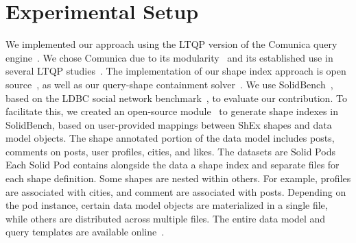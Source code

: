 \section{Experimental Setup}






We implemented our approach using the LTQP version of the Comunica query engine~\cite{taelman_iswc_resources_comunica_2018}.
We chose Comunica due to its modularity~\cite{taelman_swj_componentsjs_2022} and its established use in several LTQP studies~\cite{Bogaerts2021LinkTW, Taelman2023, eschauzier_quweda_linkqueue_2023, Hanski2024, eschauzier_amw_rcubemetric_2024, tam2024opportunitiesshapebasedoptimizationlink}.
The implementation of our shape index approach is open source~, as well as our query-shape containment solver~.
We use SolidBench~\cite{Taelman2023}, based on the LDBC social network benchmark~\cite{Angles2020}, to evaluate our contribution. 
To facilitate this, we created an open-source module~ to generate shape indexes in SolidBench, based on user-provided mappings between ShEx shapes and data model objects.
The shape annotated portion of the data model includes posts, comments on posts, user profiles, cities, and likes.
The datasets are Solid Pods~\cite{Taelman2023}
Each Solid Pod contains alongside the data a shape index and separate files for each shape definition.
Some shapes are nested within others. 
For example, profiles are associated with cities, and comment are associated with posts.
Depending on the pod instance, certain data model objects are materialized in a single file, while others are distributed across multiple files.
The entire data model and query templates are available online~.

